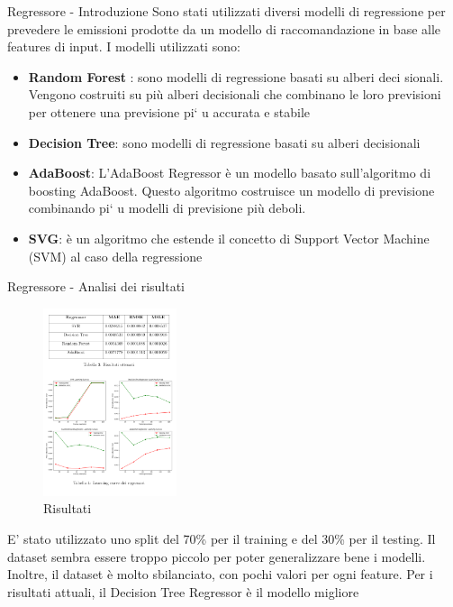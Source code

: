 \begin{frame}{Regressore - Introduzione}
Sono stati utilizzati diversi modelli di regressione per prevedere le emissioni prodotte da un modello di raccomandazione in base alle features di input. I modelli utilizzati sono:
\begin{itemize}
    \item \textbf{Random Forest} : sono modelli di regressione basati su alberi deci
    sionali. Vengono costruiti su più alberi decisionali che combinano le loro previsioni per ottenere una previsione
     pi` u accurata e stabile
    \item \textbf{Decision Tree}: sono modelli di regressione basati su alberi decisionali
    \item \textbf{AdaBoost}:  L’AdaBoost Regressor è un modello basato sull’algoritmo di boosting AdaBoost.
    Questo algoritmo costruisce un modello di previsione combinando pi` u modelli di previsione più deboli.
    \item \textbf{SVG}: è un algoritmo che estende il concetto di Support Vector Machine (SVM) al caso della regressione
\end{itemize}
\end{frame}
    


\begin{frame}{Regressore - Analisi dei risultati}
    \begin{figure}
    \centering
    \includegraphics[width=0.35\textwidth]{images/RegressorePrecedente.png}
    \caption{Risultati}
\end{figure}

E' stato utilizzato uno split del 70\% per il training e del 30\% per il testing.
Il dataset sembra essere troppo piccolo per poter generalizzare bene i modelli. Inoltre, il dataset è molto sbilanciato, con pochi valori per ogni feature. Per i risultati attuali, il Decision Tree Regressor è il modello migliore
\end{frame}
